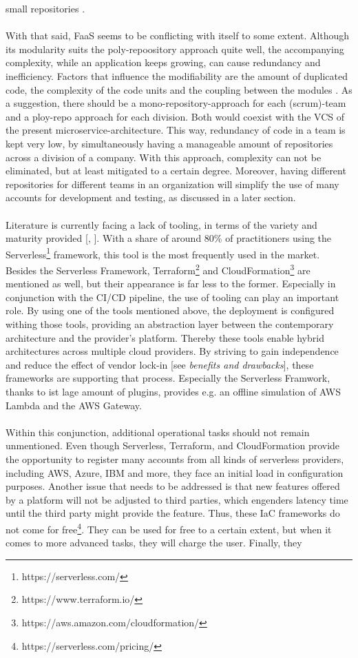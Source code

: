 \documentclass[11pt]{article}
\begin{document}
small repositories \cite{brousse2019issue}.\\\\ With that said, FaaS seems to be conflicting with itself to some extent. Although its modularity suits the poly-repoository approach quite well, the accompanying complexity, while an application keeps growing, can cause redundancy and inefficiency. Factors that inﬂuence the modiﬁability are the amount of duplicated code, the complexity of the code units and the coupling between the modules \cite{racicot2019quality}. As a suggestion, there should be a mono-repository-approach for each (scrum)-team and a ploy-repo approach for each division. Both would coexist with the VCS of the present microservice-architecture. This way, redundancy of code in a team is kept very low, by simultaneously having a manageable amount of repositories across a division of a company. With this approach, complexity can not be eliminated, but at least mitigated to a certain degree. Moreover, having different repositories for different teams in an organization will simplify the use of many accounts for development and testing, as discussed in a later section.\\\\ Literature is currently facing a lack of tooling, in terms of the variety and maturity provided [\cite{Yussupov2019_SystematicMappingStudyFaaS}, \cite{leitner2019mixed}]. With a share of around 80\% \cite{leitner2019mixed} of practitioners using the Serverless\footnote{https://serverless.com/} framework, this tool is the most frequently used in the market. Besides the Serverless Framework, Terraform\footnote{https://www.terraform.io/} and CloudFormation\footnote{https://aws.amazon.com/cloudformation/} are mentioned as well, but their appearance is far less to the former. Especially in conjunction with the CI/CD pipeline, the use of tooling can play an important role. By using one of the tools mentioned above, the deployment is configured withing those tools, providing an abstraction layer between the contemporary architecture and the provider's platform. Thereby these tools enable hybrid architectures across multiple cloud providers. By striving to gain independence and reduce the effect of vendor lock-in [see \textit{benefits and drawbacks}], these frameworks are supporting that process. Especially the Serverless Framwork, thanks to ist lage amount of plugins, provides e.g. an offline simulation of AWS Lambda and the AWS Gateway. \\\\ Within this conjunction, additional operational tasks should not remain unmentioned. Even though Serverless, Terraform, and CloudFormation provide the opportunity to register many accounts from all kinds of serverless providers, including AWS, Azure, IBM and more, they face an initial load in configuration purposes. Another issue that needs to be addressed is that new features offered by a platform will not be adjusted to third parties, which engenders latency time until the third party might provide the feature. Thus, these IaC frameworks do not come for free\footnote{https://serverless.com/pricing/}. They can be used for free to a certain extent, but when it comes to more advanced tasks, they will charge the user. Finally, they 
\end{document}
